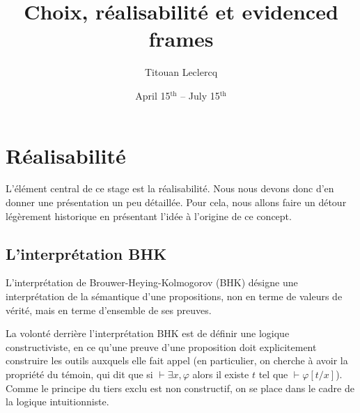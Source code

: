 \documentclass{article}
\title{Choix, réalisabilité et evidenced frames}
\author{Titouan Leclercq}
\date{April 15$^{\mathrm{th}}$ -- July 15$^{\mathrm{th}}$}
\begin{document}
\maketitle

\tableofcontents

\section{Réalisabilité}

L'élément central de ce stage est la réalisabilité. Nous nous devons donc d'en donner une présentation un peu détaillée. Pour cela, nous allons faire un détour légèrement historique en présentant l'idée à l'origine de ce concept.

\subsection{L'interprétation BHK}

L'interprétation de Brouwer-Heying-Kolmogorov (BHK) désigne une interprétation de la sémantique d'une propositions, non en terme de valeurs de vérité, mais en terme d'ensemble de ses preuves.

La volonté derrière l'interprétation BHK est de définir une logique constructiviste, en ce qu'une preuve d'une proposition doit explicitement construire les outils auxquels elle fait appel (en particulier, on cherche à avoir la propriété du témoin, qui dit que si $\vdash \exists x, \varphi$ alors il existe $t$ tel que $\vdash \varphi[t/x]$). Comme le principe du tiers exclu est non constructif, on se place dans le cadre de la logique intuitionniste.
\end{document}
